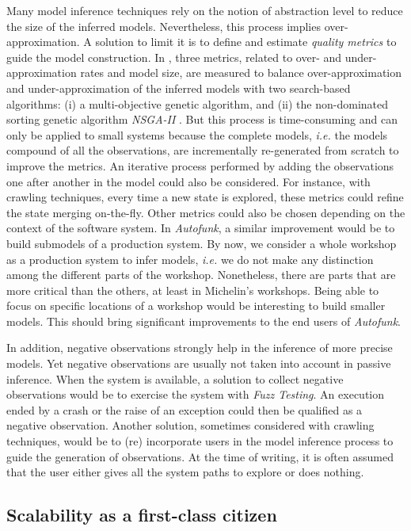 Many model inference techniques rely on the notion of abstraction
level to reduce the size of the inferred models. Nevertheless,
this process implies over-approximation. A solution to limit it
is to define and estimate \emph{quality metrics}
\cite{tonella2012finding,Lo20122063} to guide the model
construction. In \cite{tonella2012finding}, three metrics,
related to over- and under-approximation rates and model size,
are measured to balance over-approximation and
under-approximation of the inferred models with two search-based
algorithms: (i) a multi-objective genetic algorithm, and (ii) the
non-dominated sorting genetic algorithm \textit{NSGA-II}
\cite{deb2002fast}. But this process is time-consuming and can
only be applied to small systems because the complete models,
\emph{i.e.} the models compound of all the observations, are
incrementally re-generated from scratch to improve the metrics.
An iterative process performed by adding the observations one
after another in the model could also be considered. For
instance, with crawling techniques, every time a new state is
explored, these metrics could refine the state merging
on-the-fly. Other metrics could also be chosen depending on the
context of the software system. In \textit{Autofunk}, a similar
improvement would be to build submodels of a production system.
By now, we consider a whole workshop as a production system to
infer models, \emph{i.e.} we do not make any distinction among
the different parts of the workshop. Nonetheless, there are parts
that are more critical than the others, at least in Michelin's
workshops. Being able to focus on specific locations of a
workshop would be interesting to build smaller models. This
should bring significant improvements to the end users of
\textit{Autofunk}.

In addition, negative observations strongly help in the inference
of more precise models. Yet negative observations are usually not
taken into account in passive inference.  When the system is
available, a solution to collect negative observations would be
to exercise the system with \emph{Fuzz Testing}.  An execution
ended by a crash or the raise of an exception could then be
qualified as a negative observation.  Another solution, sometimes
considered with crawling techniques, would be to (re) incorporate
users in the model inference process to guide the generation of
observations. At the time of writing, it is often assumed that
the user either gives all the system paths to explore or does
nothing.

\subsection{Scalability as a first-class citizen}

